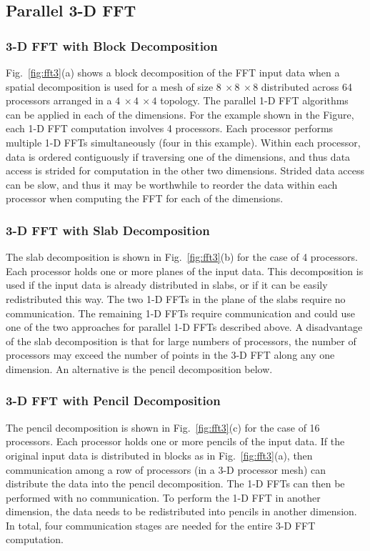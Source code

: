 \subsection{Parallel 3-D FFT}

\subsubsection*{3-D FFT with Block Decomposition}  
Fig.~\ref{fig:fft3}(a) shows a block decomposition of the FFT input
data when a spatial decomposition is used for a mesh of size $8~\times
8~\times 8$ distributed across 64 processors arranged in a $4~\times
4~\times 4$ topology.  The parallel 1-D FFT algorithms can be applied in
each of the dimensions.  For the example shown in the Figure, each 1-D
FFT computation involves 4 processors.  Each processor performs multiple
1-D FFTs simultaneously (four in this example).  Within each processor,
data is ordered contiguously if traversing one of the dimensions, and
thus data access is strided for computation in the other two dimensions.
Strided data access can be slow, and thus it may be worthwhile to reorder
the data within each processor when computing the FFT for each of the dimensions.

\subsubsection*{3-D FFT with Slab Decomposition}  
The slab decomposition is shown in 
Fig.~\ref{fig:fft3}(b) for the case of 4 processors.  Each processor holds
one or more planes of the input data.  This decomposition is used if
the input data is already distributed in slabs, or if it can be easily
redistributed this way.  The two 1-D FFTs in the plane of the slabs
require no communication.  The remaining 1-D FFTs require communication
and could use one of the two approaches for parallel 1-D FFTs described above.  
A disadvantage
of the slab decomposition is that for large numbers of processors, the
number of processors may exceed the number of points in the 3-D FFT along
any one dimension.  An alternative is the pencil decomposition below.

\subsubsection*{3-D FFT with Pencil Decomposition}  
The pencil decomposition
is shown in Fig.~\ref{fig:fft3}(c) for the case of 16 processors.
Each processor holds one or more pencils of the input data.  If the
original input data is distributed in blocks as in Fig.~\ref{fig:fft3}(a),
then communication among a row of processors (in a 3-D processor mesh)
can distribute the data into the pencil decomposition.  The 1-D FFTs
can then be performed with no communication.  To perform the 1-D FFT in
another dimension, the data needs to be redistributed into pencils in
another dimension.  In total, four communication stages are needed for
the entire 3-D FFT computation.

